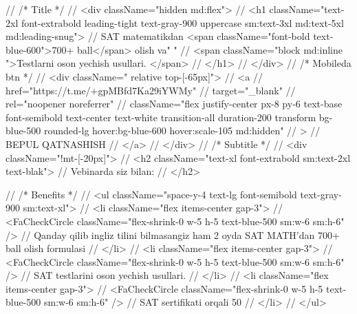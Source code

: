 {//                     {/* Title */}
//                     <div className="hidden md:flex">
//                         <h1 className="text-2xl font-extrabold leading-tight text-gray-900 uppercase sm:text-3xl md:text-5xl md:leading-snug">
//                             SAT matematikdan <span className="font-bold text-blue-600">700+ ball</span> olish va{" "}
//                             <span className="block md:inline ">Testlarni oson yechish usullari. </span>
//                         </h1>
//                     </div>
//                     {/* Mobileda btn */}
//                     <div className=" relative top-[-65px]">
//                         <a
//                             href="https://t.me/+gpMBfd7Ka29iYWMy"
//                             target="_blank"
//                             rel="noopener noreferrer"
//                             className="flex justify-center px-8 py-6 text-base font-semibold text-center text-white transition-all duration-200 transform bg-blue-500 rounded-lg hover:bg-blue-600 hover:scale-105 md:hidden"
//                         >
//                             BEPUL QATNASHISH
//                         </a>
//                     </div>
//                     {/* Subtitle */}
//                     <div className="!mt-[-20px]">
//                         <h2 className="text-xl font-extrabold sm:text-2xl text-blak">
//                             Vebinarda siz bilan:
//                         </h2>

//                         {/* Benefits */}
//                         <ul className="space-y-4 text-lg font-semibold text-gray-900 sm:text-xl">
//                             <li className="flex items-center gap-3">
//                                 <FaCheckCircle className="flex-shrink-0 w-5 h-5 text-blue-500 sm:w-6 sm:h-6" />
//                                 Qanday qilib ingliz tilini bilmasangiz ham 2 oyda SAT MATH’dan 700+ ball olish formulasi
//                             </li>
//                             <li className="flex items-center gap-3">
//                                 <FaCheckCircle className="flex-shrink-0 w-5 h-5 text-blue-500 sm:w-6 sm:h-6" />
//                                 SAT testlarini oson yechish usullari.
//                             </li>
//                             <li className="flex items-center gap-3">
//                                 <FaCheckCircle className="flex-shrink-0 w-5 h-5 text-blue-500 sm:w-6 sm:h-6" />
//                                 SAT sertifikati orqali 50%
//                             </li>
//                         </ul>


}
